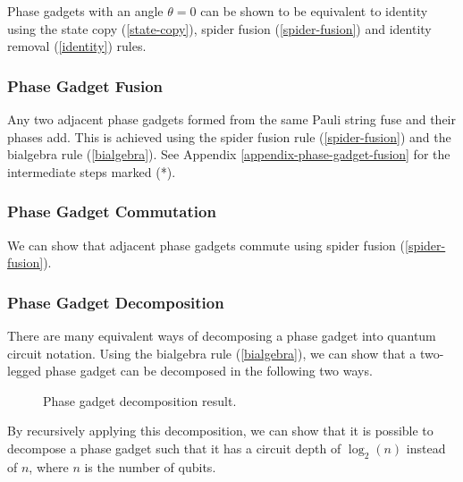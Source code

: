 Phase gadgets with an angle $\theta = 0$ can be shown to be equivalent to identity using the state copy (\ref{state-copy}), spider fusion (\ref{spider-fusion}) and identity removal (\ref{identity}) rules.



\subsubsection{Phase Gadget Fusion}%
\label{phase-gadget-fusion}

Any two adjacent phase gadgets formed from the same Pauli string fuse and their phases add. This is achieved using the spider fusion rule (\ref{spider-fusion}) and the bialgebra rule (\ref{bialgebra}). See Appendix  \ref{appendix-phase-gadget-fusion} for the intermediate steps marked (*).



\subsubsection{Phase Gadget Commutation}%
\label{phase-gadget-commutation}

We can show that adjacent phase gadgets commute using spider fusion (\ref{spider-fusion}).



\subsubsection{Phase Gadget Decomposition}%

There are many equivalent ways of decomposing a phase gadget into quantum circuit notation. Using the bialgebra rule (\ref{bialgebra}), we can show that a two-legged phase gadget can be decomposed in the following two ways.

\begin{figure}[H]
    \centering
    \caption{Phase gadget decomposition result.}
    \label{phase-gadget-decomposition}
\end{figure}

By recursively applying this decomposition, we can show that it is possible to decompose a phase gadget such that it has a circuit depth of $\log_2(n)$ instead of $n$, where $n$ is the number of qubits.

